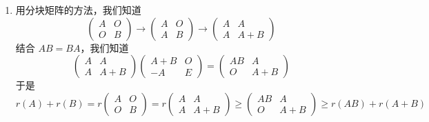 \begin{exercise}
\begin{exgroup}
\begin{answer}
\begin{enumerate}
                \item 用分块矩阵的方法，我们知道
                      \[\begin{pmatrix}A & O \\ O & B\end{pmatrix}\rightarrow \begin{pmatrix}A & O \\ A & B\end{pmatrix}\rightarrow \begin{pmatrix}A & A \\ A & A+B\end{pmatrix}\]
                      结合 $AB=BA$，我们知道
                      \[\begin{pmatrix}A & A \\ A & A+B\end{pmatrix}\begin{pmatrix}A+B & O \\ -A & E\end{pmatrix}=\begin{pmatrix}AB & A \\ O & A+B\end{pmatrix}\]
                      于是
                      \[r(A)+r(B)=r\begin{pmatrix}A & O \\ O & B\end{pmatrix}=r\begin{pmatrix}A & A \\ A & A+B\end{pmatrix}\geqslant \begin{pmatrix}AB & A \\ O & A+B\end{pmatrix}\geqslant r(AB)+r(A+B)\]
            \end{enumerate}
        \end{answer}


\end{exgroup}
\end{exercise}

